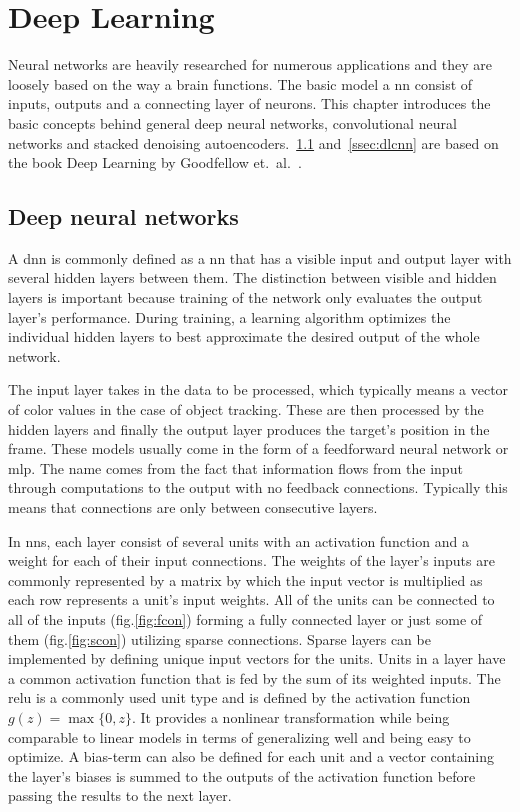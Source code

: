 \section{Deep Learning}
Neural networks are heavily researched for numerous applications and they are loosely
based on the way a brain functions. The basic model a \ac{nn} consist of inputs, outputs
and a connecting layer of neurons. This chapter introduces the basic concepts behind
general deep neural networks, convolutional neural networks and stacked denoising
autoencoders.~\ref{ssec:dldnn} and~\ref{ssec:dlcnn} are based on the book Deep Learning by
Goodfellow et.~al.~\cite{DEEP_LEARNING}.

\subsection{Deep neural networks}\label{ssec:dldnn}

A \ac{dnn} is commonly defined as a \ac{nn} that has a visible input and
output layer with several hidden layers between them. The distinction between
visible and hidden layers is important because training of the network only evaluates
the output layer's performance. During training, a learning algorithm optimizes
the individual hidden layers to best approximate the desired output of the whole network.

The input layer takes in the data to be processed, which typically means a vector of
color values in the case of object tracking. These are then processed by the hidden
layers and finally the output layer produces the target's position in the frame. These
models usually come in the form of a feedforward neural network or
\ac{mlp}. The name comes from the fact that information flows from the input
through computations to the output with no feedback connections. Typically
this means that connections are only between consecutive layers.

In \ac{nn}s, each layer consist of several units with an activation function
and a weight for each of their input connections. The weights of the layer's inputs
are commonly represented by a matrix by which the input vector is multiplied as each
row represents a unit's input weights. All of the units can be connected to all of the
inputs (fig.\ref{fig:fcon}) forming a fully connected layer or just some of them
(fig.\ref{fig:scon}) utilizing sparse connections. Sparse layers can be implemented
by defining unique input vectors for the units. Units in a layer have a common activation
function that is fed by the sum of its weighted inputs. The \ac{relu} is a
commonly used unit type and is defined by the activation function $g (z) = \max\{0,z\}$.
It provides a nonlinear transformation while being comparable to linear models in terms
of generalizing well and being easy to optimize. A bias-term can also be defined for
each unit and a vector containing the layer's biases is summed to the outputs of the
activation function before passing the results to the next layer.

